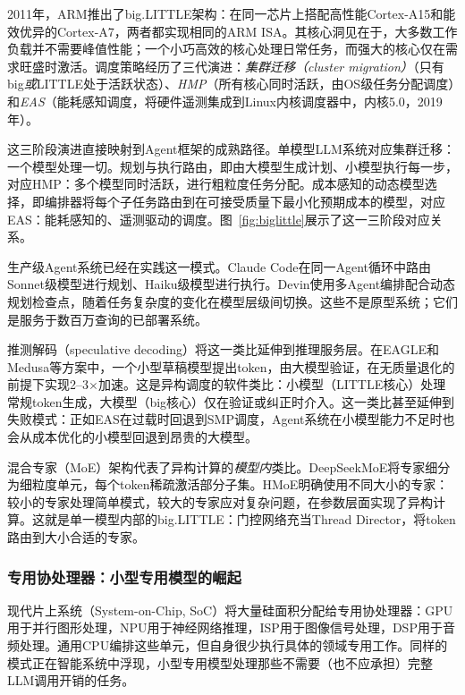 2011年，ARM推出了big.LITTLE架构：在同一芯片上搭配高性能Cortex-A15和能效优异的Cortex-A7，两者都实现相同的ARM ISA\cite{biglittle_arm_2012}。其核心洞见在于，大多数工作负载并不需要峰值性能；一个小巧高效的核心处理日常任务，而强大的核心仅在需求旺盛时激活。调度策略经历了三代演进：\textit{集群迁移（cluster migration）}（只有big\textit{或}LITTLE处于活跃状态）、\textit{HMP}（所有核心同时活跃，由OS级任务分配调度）和\textit{EAS}（能耗感知调度，将硬件遥测集成到Linux内核调度器中，内核5.0，2019年）\cite{eas_linux_2019}。

这三阶段演进直接映射到Agent框架的成熟路径。单模型LLM系统对应集群迁移：一个模型处理一切。规划与执行路由，即由大模型生成计划、小模型执行每一步，对应HMP：多个模型同时活跃，进行粗粒度任务分配。成本感知的动态模型选择，即编排器将每个子任务路由到在可接受质量下最小化预期成本的模型，对应EAS：能耗感知的、遥测驱动的调度\cite{kumar_2003_singleISA, saez_2022_thread_director}。图~\ref{fig:biglittle}展示了这一三阶段对应关系。



生产级Agent系统已经在实践这一模式。Claude Code在同一Agent循环中路由Sonnet级模型进行规划、Haiku级模型进行执行。Devin使用多Agent编排配合动态规划检查点，随着任务复杂度的变化在模型层级间切换。这些不是原型系统；它们是服务于数百万查询的已部署系统。

推测解码（speculative decoding）将这一类比延伸到推理服务层。在EAGLE和Medusa等方案中，一个小型草稿模型提出token，由大模型验证，在无质量退化的前提下实现2--3$\times$加速\cite{li_2024_eagle}。这是异构调度的软件类比：小模型（LITTLE核心）处理常规token生成，大模型（big核心）仅在验证或纠正时介入。这一类比甚至延伸到失败模式：正如EAS在过载时回退到SMP调度，Agent系统在小模型能力不足时也会从成本优化的小模型回退到昂贵的大模型。

混合专家（MoE）架构代表了异构计算的\textit{模型内}类比。DeepSeekMoE将专家细分为细粒度单元，每个token稀疏激活部分子集\cite{deepseek_2024_moe}。HMoE明确使用不同大小的专家：较小的专家处理简单模式，较大的专家应对复杂问题，在参数层面实现了异构计算\cite{wang_2024_hmoe}。这就是单一模型内部的big.LITTLE：门控网络充当Thread Director，将token路由到大小合适的专家。

\subsubsection{专用协处理器：小型专用模型的崛起}

现代片上系统（System-on-Chip, SoC）将大量硅面积分配给专用协处理器：GPU用于并行图形处理，NPU用于神经网络推理，ISP用于图像信号处理，DSP用于音频处理。通用CPU编排这些单元，但自身很少执行具体的领域专用工作。同样的模式正在智能系统中浮现，小型专用模型处理那些不需要（也不应承担）完整LLM调用开销的任务。

